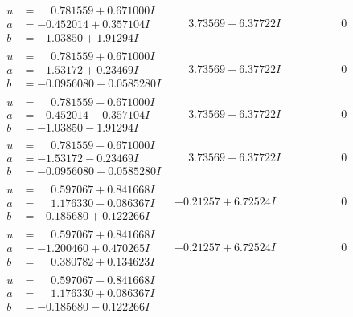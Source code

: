\documentclass[1p]{elsarticle_modified}
\theoremstyle{definition}
\begin{document}
$$\begin{array}{c|c|c}
\begin{aligned}
u &= \phantom{-}0.781559 + 0.671000 I \\
a &= -0.452014 + 0.357104 I \\
b &= -1.03850 + 1.91294 I\end{aligned}
 & \phantom{-}3.73569 + 6.37722 I & \phantom{-0.000000 } 0 \\ \hline\begin{aligned}
u &= \phantom{-}0.781559 + 0.671000 I \\
a &= -1.53172 + 0.23469 I \\
b &= -0.0956080 + 0.0585280 I\end{aligned}
 & \phantom{-}3.73569 + 6.37722 I & \phantom{-0.000000 } 0 \\ \hline\begin{aligned}
u &= \phantom{-}0.781559 - 0.671000 I \\
a &= -0.452014 - 0.357104 I \\
b &= -1.03850 - 1.91294 I\end{aligned}
 & \phantom{-}3.73569 - 6.37722 I & \phantom{-0.000000 } 0 \\ \hline\begin{aligned}
u &= \phantom{-}0.781559 - 0.671000 I \\
a &= -1.53172 - 0.23469 I \\
b &= -0.0956080 - 0.0585280 I\end{aligned}
 & \phantom{-}3.73569 - 6.37722 I & \phantom{-0.000000 } 0 \\ \hline\begin{aligned}
u &= \phantom{-}0.597067 + 0.841668 I \\
a &= \phantom{-}1.176330 - 0.086367 I \\
b &= -0.185680 + 0.122266 I\end{aligned}
 & -0.21257 + 6.72524 I & \phantom{-0.000000 } 0 \\ \hline\begin{aligned}
u &= \phantom{-}0.597067 + 0.841668 I \\
a &= -1.200460 + 0.470265 I \\
b &= \phantom{-}0.380782 + 0.134623 I\end{aligned}
 & -0.21257 + 6.72524 I & \phantom{-0.000000 } 0 \\ \hline\begin{aligned}
u &= \phantom{-}0.597067 - 0.841668 I \\
a &= \phantom{-}1.176330 + 0.086367 I \\
b &= -0.185680 - 0.122266 I\end{aligned}

\end{array}$$
\end{document}
